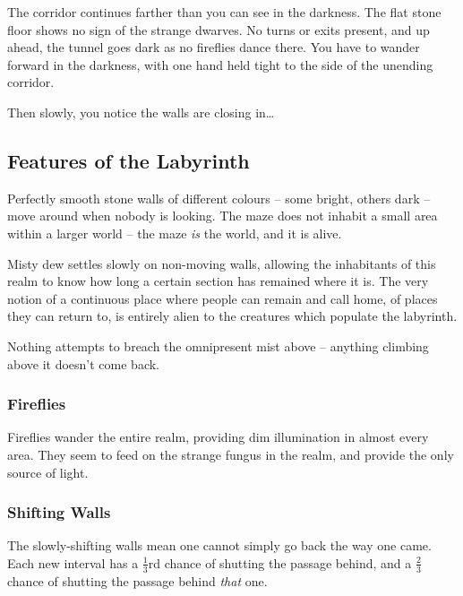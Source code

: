 \begin{multicols}{2}

\begin{boxtext}
  The corridor continues farther than you can see in the darkness.
  The flat stone floor shows no sign of the strange dwarves.
  No turns or exits present, and up ahead, the tunnel goes dark as no fireflies dance there.
  You have to wander forward in the darkness, with one hand held tight to the side of the unending corridor.

  Then slowly, you notice the walls are closing in\ldots

\end{boxtext}

\subsection{Features of the Labyrinth}

Perfectly smooth stone walls of different colours -- some bright, others dark -- move around when nobody is looking.
The maze does not inhabit a small area within a larger world -- the maze \emph{is} the world, and it is alive.

Misty dew settles slowly on non-moving walls, allowing the inhabitants of this realm to know how long a certain section has remained where it is.
The very notion of a continuous place where people can remain and call home, of places they can return to, is entirely alien to the creatures which populate the labyrinth.

Nothing attempts to breach the omnipresent mist above -- anything climbing above it doesn't come back.


\subsubsection{Fireflies}

Fireflies wander the entire realm, providing dim illumination in almost every area.
They seem to feed on the strange fungus in the realm, and provide the only source of light.

\subsubsection{Shifting Walls}

The slowly-shifting walls mean one cannot simply go back the way one came.
Each new \gls{interval} has a $\frac{1}{3}$rd chance of shutting the passage behind, and a $\frac{2}{3}$ chance of shutting the passage behind \emph{that} one.


\end{multicols}
